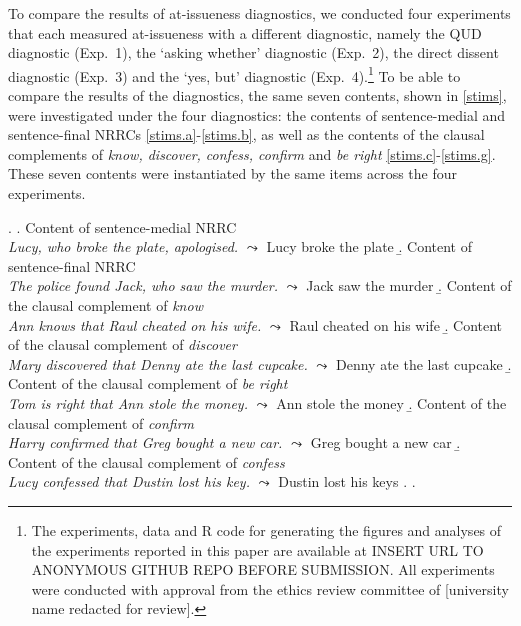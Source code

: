 \documentclass[times,linguex,xcolor]{glossa}
\begin{document}
  To compare the results of at-issueness diagnostics, we conducted four experiments that each measured at-issueness with a different diagnostic, namely the QUD diagnostic (Exp.~1), the `asking whether' diagnostic (Exp.~2), the direct dissent diagnostic (Exp.~3) and the `yes, but' diagnostic (Exp.~4).\footnote{The experiments, data and R code for generating the figures and analyses of the experiments reported in this paper are available at INSERT URL TO ANONYMOUS GITHUB REPO BEFORE SUBMISSION. All experiments were conducted with approval from the ethics review committee of [university name redacted for review].} To be able to compare the results of the diagnostics, the same seven contents, shown in \ref{stims}, were investigated under the four diagnostics: the contents of sentence-medial and sentence-final NRRCs \ref{stims.a}-\ref{stims.b}, as well as the contents of the clausal complements of \emph{know, discover, confess, confirm} and \emph{be right} \ref{stims.c}-\ref{stims.g}. These seven contents were instantiated by the same items across the four experiments.

  \ex.\label{stims}
    \a.\label{stims.a} Content of sentence-medial NRRC \\
      \emph{Lucy, who broke the plate, apologised.} $\leadsto$ Lucy broke the plate
    \b.\label{stims.b} Content of sentence-final NRRC \\
    \emph{The police found Jack, who saw the murder.} $\leadsto$ Jack saw the murder
    \b.\label{stims.c} Content of the clausal complement of \emph{know} \\
    \emph{Ann knows that Raul cheated on his wife.} $\leadsto$ Raul cheated on his wife
    \b.\label{stims.d} Content of the clausal complement of \emph{discover} \\
    \emph{Mary discovered that Denny ate the last cupcake.} $\leadsto$ Denny ate the last cupcake
    \b.\label{stims.e} Content of the clausal complement of \emph{be right} \\
    \emph{Tom is right that Ann stole the money.} $\leadsto$ Ann stole the money
    \b.\label{stims.f} Content of the clausal complement of \emph{confirm} \\
    \emph{Harry confirmed that Greg bought a new car.} $\leadsto$ Greg bought a new car
    \b.\label{stims.g} Content of the clausal complement of \emph{confess}  \\
    \emph{Lucy confessed that Dustin lost his key.} $\leadsto$ Dustin lost his keys
    \z.
  \z.
  
\end{document}
